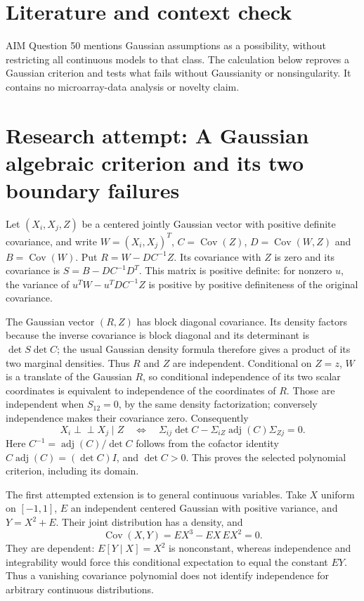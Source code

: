 \documentclass[11pt]{article}
\begin{document}
\section{Literature and context check}
AIM Question 50 mentions Gaussian assumptions as a possibility, without restricting all continuous models to that class. The calculation below reproves a Gaussian criterion and tests what fails without Gaussianity or nonsingularity. It contains no microarray-data analysis or novelty claim.
\section{Research attempt: A Gaussian algebraic criterion and its two boundary failures}
Let $(X_i,X_j,Z)$ be a centered jointly Gaussian vector with positive definite covariance, and write $W=(X_i,X_j)^T$, $C=\operatorname{Cov}(Z)$, $D=\operatorname{Cov}(W,Z)$ and $B=\operatorname{Cov}(W)$. Put $R=W-DC^{-1}Z$. Its covariance with $Z$ is zero and its covariance is $S=B-DC^{-1}D^T$. This matrix is positive definite: for nonzero $u$, the variance of $u^TW-u^TDC^{-1}Z$ is positive by positive definiteness of the original covariance.

The Gaussian vector $(R,Z)$ has block diagonal covariance. Its density factors because the inverse covariance is block diagonal and its determinant is $\det S\det C$; the usual Gaussian density formula therefore gives a product of its two marginal densities. Thus $R$ and $Z$ are independent. Conditional on $Z=z$, $W$ is a translate of the Gaussian $R$, so conditional independence of its two scalar coordinates is equivalent to independence of the coordinates of $R$. Those are independent when $S_{12}=0$, by the same density factorization; conversely independence makes their covariance zero. Consequently
\[
X_i\mathbin{\perp\!\!\!\perp}X_j\mid Z
\quad\Longleftrightarrow\quad
\Sigma_{ij}\det C-\Sigma_{iZ}\operatorname{adj}(C)\Sigma_{Zj}=0.
\]
Here $C^{-1}=\operatorname{adj}(C)/\det C$ follows from the cofactor identity $C\operatorname{adj}(C)=(\det C)I$, and $\det C>0$. This proves the selected polynomial criterion, including its domain.

The first attempted extension is to general continuous variables. Take $X$ uniform on $[-1,1]$, $E$ an independent centered Gaussian with positive variance, and $Y=X^2+E$. Their joint distribution has a density, and
\[
\operatorname{Cov}(X,Y)=E X^3-E X\,E X^2=0.
\]
They are dependent: $E[Y\mid X]=X^2$ is nonconstant, whereas independence and integrability would force this conditional expectation to equal the constant $E Y$. Thus a vanishing covariance polynomial does not identify independence for arbitrary continuous distributions.
\end{document}
